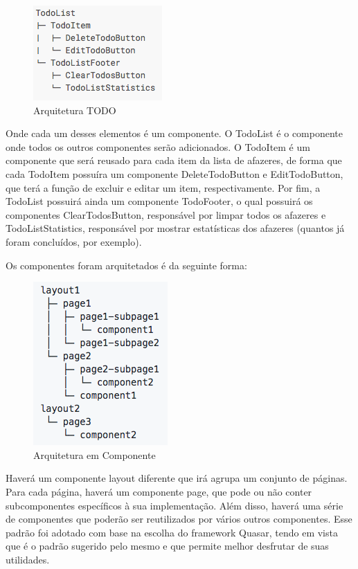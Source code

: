 \begin{apendicesenv}
\begin{figure}[!ht]
	\centering
		\includegraphics[scale=0.6]{figuras/software/5-arquitetura-todo.png}
	\caption{Arquitetura TODO}
\end{figure}

Onde cada um desses elementos é um componente. O TodoList é o componente onde todos os outros componentes serão adicionados. O TodoItem é um componente que será reusado para cada item da lista de afazeres, de forma que cada TodoItem possuíra um componente DeleteTodoButton e EditTodoButton, que terá a função de excluir e editar um item, respectivamente. Por fim, a TodoList possuirá ainda um componente TodoFooter, o qual possuirá os componentes ClearTodosButton, responsável por limpar todos os afazeres e TodoListStatistics, responsável por mostrar estatísticas dos afazeres (quantos já foram concluídos, por exemplo).

Os componentes foram arquitetados é da seguinte forma:

\begin{figure}[!ht]
	\centering
		\includegraphics[scale=0.6]{figuras/software/6-arquitetura-componentes-projeto.png}
	\caption{Arquitetura em Componente}
\end{figure}

Haverá um componente layout diferente que irá agrupa um conjunto de páginas. Para cada página, haverá um componente page, que pode ou não conter subcomponentes específicos à sua implementação. Além disso, haverá uma série de componentes que poderão ser reutilizados por vários outros componentes. Esse padrão foi adotado com base na escolha do framework Quasar, tendo em vista que é o padrão sugerido pelo mesmo e que permite melhor
desfrutar de suas utilidades.\cite{arquiteturaCompView} \cite{estruturaQuasar}
 

\end{apendicesenv}
